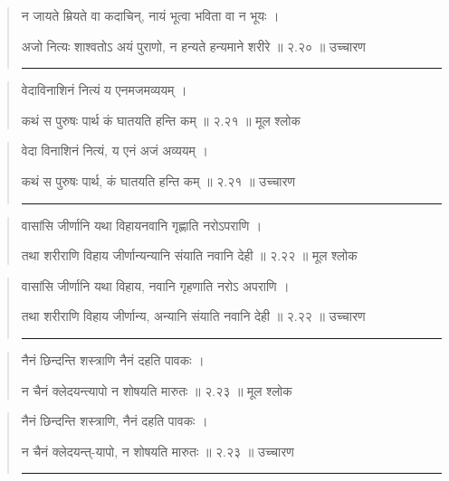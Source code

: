 \begin{quotation}

न जायते म्रियते वा कदाचिन्, 
नायं भूत्वा भविता वा न भूयः  ।  

अजो नित्यः शाश्वतोऽ अयं पुराणो, 
न हन्यते हन्यमाने शरीरे  ॥ २.२० ॥  उच्चारण

\noindent\rule{16cm}{0.4pt} 
\end{quotation}


\begin{quotation}

वेदाविनाशिनं नित्यं य एनमजमव्ययम्‌  ।  

कथं स पुरुषः पार्थ कं घातयति हन्ति कम्‌  ॥ २.२१ ॥  मूल श्लोक
\end{quotation}

\begin{quotation}

वेदा विनाशिनं नित्यं, य एनं अजं अव्ययम्‌  ।  

कथं स पुरुषः पार्थ, कं घातयति हन्ति कम्‌  ॥ २.२१ ॥  उच्चारण

\noindent\rule{16cm}{0.4pt} 
\end{quotation}


\begin{quotation}

वासांसि जीर्णानि यथा विहायनवानि गृह्णाति नरोऽपराणि  ।  

तथा शरीराणि विहाय जीर्णान्यन्यानि संयाति नवानि देही  ॥ २.२२ ॥  मूल श्लोक
\end{quotation}

\begin{quotation}

वासांसि जीर्णानि यथा विहाय, 
नवानि गृहणाति नरोऽ अपराणि  ।  

तथा शरीराणि विहाय जीर्णान्य, 
अन्यानि संयाति नवानि देही  ॥ २.२२ ॥  उच्चारण

\noindent\rule{16cm}{0.4pt} 
\end{quotation}


\begin{quotation}

नैनं छिन्दन्ति शस्त्राणि नैनं दहति पावकः  ।  

न चैनं क्लेदयन्त्यापो न शोषयति मारुतः  ॥ २.२३ ॥  मूल श्लोक
\end{quotation}

\begin{quotation}

नैनं छिन्दन्ति शस्त्राणि, नैनं दहति पावकः  ।  

न चैनं क्लेदयन्त्-यापो, न शोषयति मारुतः  ॥ २.२३ ॥  उच्चारण

\noindent\rule{16cm}{0.4pt} 
\end{quotation}


